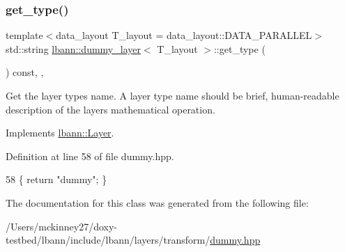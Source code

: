 \subsubsection{\texorpdfstring{get\+\_\+type()}{get\_type()}}
{\footnotesize\ttfamily template$<$data\+\_\+layout T\+\_\+layout = data\+\_\+layout\+::\+D\+A\+T\+A\+\_\+\+P\+A\+R\+A\+L\+L\+EL$>$ \\
std\+::string \hyperlink{classlbann_1_1dummy__layer}{lbann\+::dummy\+\_\+layer}$<$ T\+\_\+layout $>$\+::get\+\_\+type (\begin{DoxyParamCaption}{ }\end{DoxyParamCaption}) const\hspace{0.3cm}{\ttfamily [inline]}, {\ttfamily [override]}, {\ttfamily [virtual]}}

Get the layer type\textquotesingle{}s name. A layer type name should be brief, human-\/readable description of the layer\textquotesingle{}s mathematical operation. 

Implements \hyperlink{classlbann_1_1Layer_a0fa0ea9160b490c151c0a17fde4f7239}{lbann\+::\+Layer}.



Definition at line 58 of file dummy.\+hpp.


\begin{DoxyCode}
58 \{ \textcolor{keywordflow}{return} \textcolor{stringliteral}{"dummy"}; \}
\end{DoxyCode}


The documentation for this class was generated from the following file\+:\begin{DoxyCompactItemize}
\item 
/\+Users/mckinney27/doxy-\/testbed/lbann/include/lbann/layers/transform/\hyperlink{dummy_8hpp}{dummy.\+hpp}\end{DoxyCompactItemize}
